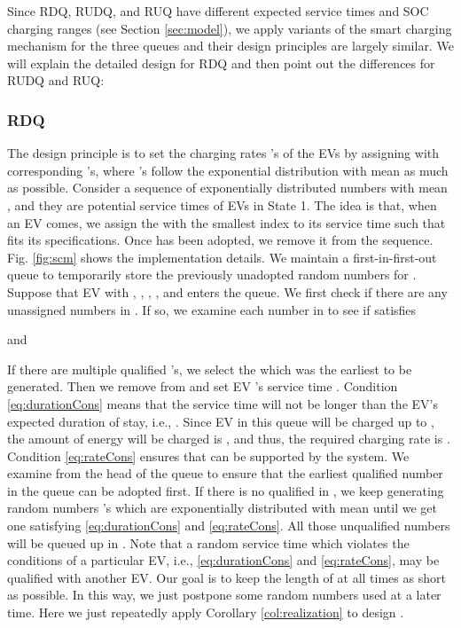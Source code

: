 \documentclass[journal]{IEEEtran}
\begin{document}
Since RDQ, RUDQ, and RUQ have different expected service times and SOC charging ranges (see Section \ref{sec:model}), we apply variants of the smart charging mechanism for the three queues and their design principles are largely similar. We will explain the detailed design for RDQ and then point out the differences for RUDQ and RUQ:

\subsubsection{RDQ}
The design principle is to set the charging rates 's of the EVs by assigning with corresponding 's, where 's follow the exponential distribution with mean  as much as possible.   
Consider a sequence of exponentially distributed numbers  with mean , and they are potential service times of  EVs in State 1. The idea is that, when an EV comes, we assign the  with the smallest index  to its service time such that  fits its specifications. Once  has been adopted, we remove it from the sequence.
Fig. \ref{fig:scm} shows the implementation details. We maintain a first-in-first-out queue  to temporarily store the previously unadopted random numbers for .
Suppose that EV  with , , , , and  enters the queue. We first check if there are any unassigned numbers in . If so, we examine each number  in  to see if  satisfies 

and

If there are multiple qualified 's, we select the  which was the earliest to be generated. Then we remove  from  and set EV 's service time . 
Condition \eqref{eq:durationCons} means that the service time  will not be longer than the EV's expected duration of stay, i.e., . Since  EV  in this queue will be charged up to ,  the amount of energy will be charged  is , and thus, the required charging rate is .  Condition \eqref{eq:rateCons} ensures that  can be supported by the system.
We examine from the head of the queue to ensure that the earliest qualified number in the queue can be adopted first. 
If there is no qualified  in ,  we keep generating random numbers 's which are exponentially distributed with mean  until we get one  satisfying \eqref{eq:durationCons} and \eqref{eq:rateCons}. All those unqualified numbers will be queued up in .
Note that a random service time  which violates the conditions of a particular EV, i.e., \eqref{eq:durationCons} and \eqref{eq:rateCons}, may be qualified with another EV.  Our goal is to keep the length of  at all times as short as possible. In this way, we just postpone some random numbers used at a later time. Here we just repeatedly apply Corollary \ref{col:realization} to design . 
\end{document}
